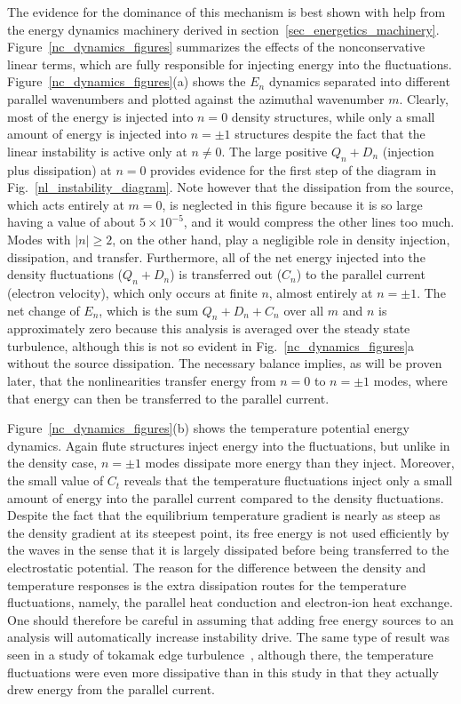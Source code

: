 \documentclass[showpacs,preprintnumbers,amsmath,amssymb,superscriptaddress,aip]{revtex4-1}
\begin{document}
The evidence for the dominance of this mechanism is best shown with
help from the energy dynamics machinery derived in section~\ref{sec_energetics_machinery}. Figure~\ref{nc_dynamics_figures} summarizes the effects of the nonconservative linear terms, which are
fully responsible for injecting energy into the fluctuations. Figure~\ref{nc_dynamics_figures}(a) shows the $E_n$ dynamics separated into different parallel wavenumbers and plotted
against the azimuthal wavenumber $m$. Clearly, most of the energy is injected into $n=0$ density structures, while only a small amount of energy is injected into
$n= \pm 1$ structures despite the fact that the linear instability is active only at $n \ne 0$. The large positive $Q_n + D_n$ (injection plus dissipation) at $n=0$ provides evidence for the first
step of the diagram in Fig.~\ref{nl_instability_diagram}. Note however that the dissipation from the source, which acts entirely at $m=0$, is neglected in this figure because it is so large 
having a value of about $5 \times 10^{-5}$, and it would compress the other lines too much.
Modes with $|n| \ge 2$, on the other hand, play a negligible role in density injection, dissipation, and transfer. 
Furthermore, all of the net energy injected into the density fluctuations ($Q_n + D_n$) is transferred out ($C_n$) to
the parallel current (electron velocity), which only occurs at finite $n$, almost entirely at $n = \pm 1$. The net change of $E_n$, which is the sum $Q_n + D_n + C_n$ over all $m$ and $n$
is approximately zero because this analysis is averaged over the steady state turbulence, although this is not so evident in Fig.~\ref{nc_dynamics_figures}a without the source dissipation. 
The necessary balance implies, as will be proven later, that the nonlinearities transfer energy from $n=0$ to $n = \pm 1$ modes, where that energy can then
be transferred to the parallel current.

Figure~\ref{nc_dynamics_figures}(b) shows the temperature potential energy dynamics. Again flute structures inject energy into the fluctuations, but unlike in the density case, $n = \pm 1$ modes
dissipate more energy than they inject. Moreover, the small value of $C_t$ reveals that the temperature fluctuations inject only a small amount of energy into the parallel current compared
to the density fluctuations. Despite the fact that the equilibrium temperature gradient is nearly as steep as the density gradient at its steepest point, 
its free energy is not used efficiently by the waves
in the sense that it is largely dissipated before being transferred to the electrostatic potential. The reason for the difference
between the density and temperature responses is the extra dissipation routes for the temperature fluctuations, namely, the parallel heat conduction and electron-ion heat exchange.
One should therefore be careful in assuming that adding free energy sources to an analysis will automatically increase instability drive.
The same type of result was seen in a study of tokamak edge turbulence~\cite{zeiler1997}, although there, the temperature fluctuations were even more dissipative than in this study in that they
actually drew energy from the parallel current. 
\end{document}
